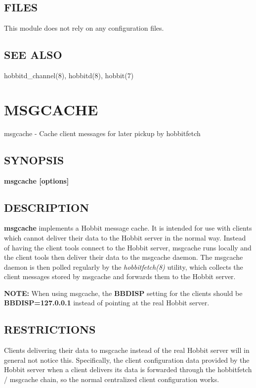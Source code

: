 \subsection{FILES}
 This module does not rely on any configuration files. 

 
\subsection{SEE ALSO}
hobbitd\_channel(8), hobbitd(8), hobbit(7) 

  

%

%

\newpage
\section{MSGCACHE}

 msgcache - Cache client messages for later pickup by hobbitfetch 

 
\subsection{SYNOPSIS}
\textbf{msgcache [options]}


 
\subsection{DESCRIPTION}
\textbf{msgcache}
 implements a Hobbit message cache. It is intended for use with clients which cannot deliver their data to the Hobbit server in the normal way. Instead of having the client tools connect to the Hobbit server, msgcache runs locally and the client tools then deliver their data to the msgcache daemon. The msgcache daemon is then polled regularly by the \emph{hobbitfetch(8)}
 utility, which collects the client messages stored by msgcache and forwards them to the Hobbit server. 

 \textbf{NOTE:}
 When using msgcache, the \textbf{BBDISP}
 setting for the clients should be \textbf{BBDISP=127.0.0.1}
 instead of pointing at the real Hobbit server. 


 
\subsection{RESTRICTIONS}
 Clients delivering their data to msgcache instead of the real Hobbit server will in general not notice this. Specifically, the client configuration data provided by the Hobbit server when a client delivers its data is forwarded through the hobbitfetch / msgcache chain, so the normal centralized client configuration works. 

